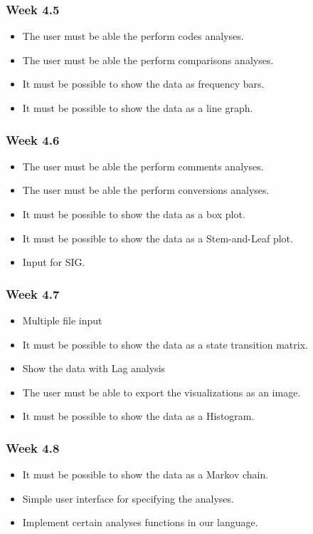 \subsubsection{Week 4.5}
\begin{itemize}
	\item The user must be able the perform codes analyses.
	\item The user must be able the perform comparisons analyses.
	\item It must be possible to show the data as frequency bars.
	\item It must be possible to show the data as a line graph.
\end{itemize}
\subsubsection{Week 4.6}
\begin{itemize}
	\item The user must be able the perform comments analyses.
	\item The user must be able the perform conversions analyses.
	\item It must be possible to show the data as a box plot.
	\item It must be possible to show the data as a Stem-and-Leaf plot.
	\item Input for SIG.
\end{itemize}
\subsubsection{Week 4.7}
\begin{itemize}
	\item Multiple file input
	\item It must be possible to show the data as a state transition matrix.
	\item Show the data with Lag analysis
	\item The user must be able to export the visualizations as an image.
	\item It must be possible to show the data as a Histogram.
\end{itemize}
\subsubsection{Week 4.8}
\begin{itemize}
	\item It must be possible to show the data as a Markov chain.
	\item Simple user interface for specifying the analyses.
	\item Implement certain analyses functions in our language.
\end{itemize}
